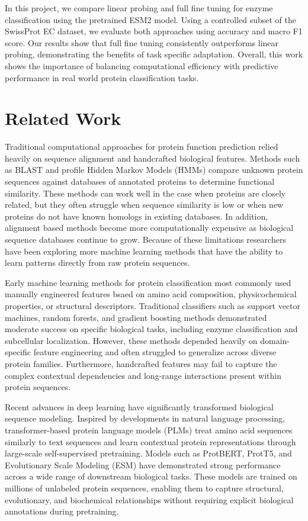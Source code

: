 \documentclass{article}
\begin{document}
In this project, we compare linear probing and full fine tuning for enzyme classification using the pretrained ESM2 model. Using a controlled subset of the SwissProt EC dataset, we evaluate both approaches using accuracy and macro F1 score. Our results show that full fine tuning consistently outperforms linear probing, demonstrating the benefits of task specific adaptation. Overall, this work shows the importance of balancing computational efficiency with predictive performance in real world protein classification tasks.

\section{Related Work}
Traditional computational approaches for protein function prediction relied heavily on sequence alignment and handcrafted biological features. Methods such as BLAST and profile Hidden Markov Models (HMMs) compare unknown protein sequences against databases of annotated proteins to determine functional similarity. These methods can work well in the case when proteins are closely related, but they often struggle when sequence similarity is low or when new proteins do not have known homologs in existing databases. In addition, alignment based methods become more computationally expensive as biological sequence databases continue to grow. Because of these limitations researchers have been exploring more machine learning methods that have the ability to learn patterns directly from raw protein sequences.

Early machine learning methods for protein classification most commonly used manually engineered features bsaed on amino acid composition, physicochemical properties, or structural descriptors. Traditional classifiers such as support vector machines, random forests, and gradient boosting methods demonstrated moderate success on specific biological tasks, including enzyme classification and subcellular localization. However, these methods depended heavily on domain-specific feature engineering and often struggled to generalize across diverse protein families. Furthermore, handcrafted features may fail to capture the complex contextual dependencies and long-range interactions present within protein sequences.

Recent advances in deep learning have significantly transformed biological sequence modeling. Inspired by developments in natural language processing, transformer-based protein language models (PLMs) treat amino acid sequences similarly to text sequences and learn contextual protein representations through large-scale self-supervised pretraining. Models such as ProtBERT, ProtT5, and Evolutionary Scale Modeling (ESM) have demonstrated strong performance across a wide range of downstream biological tasks. These models are trained on millions of unlabeled protein sequences, enabling them to capture structural, evolutionary, and biochemical relationships without requiring explicit biological annotations during pretraining.
\end{document}
